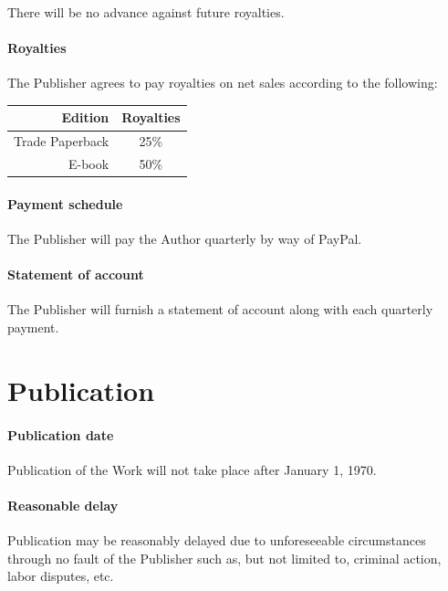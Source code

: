 \documentclass[12pt,letterpaper]{article}
\def\PrintRoyalties{25\%}
\def\DigitalRoyalties{50\%}
\def\PaymentMechanism{PayPal} %
\def\PublicationDate{January 1, 1970}
\begin{document}
There will be no advance against future royalties.

\paragraph{Royalties}

The Publisher agrees to pay royalties on net sales according to the following:

\begin{center}
\begin{tabular}{r c}
    \textbf{Edition} & \textbf{Royalties} \\ \hline
    Trade Paperback & \PrintRoyalties \\
    E-book & \DigitalRoyalties \\
    \hline
\end{tabular}
\end{center}

\paragraph{Payment schedule}

The Publisher will pay the Author quarterly by way of \PaymentMechanism.

\paragraph{Statement of account}

The Publisher will furnish a statement of account along with each quarterly payment.

\section{Publication}

\paragraph{Publication date}

Publication of the Work will not take place after \PublicationDate.

\paragraph{Reasonable delay}

Publication may be reasonably delayed due to unforeseeable circumstances through no fault of the Publisher such as, but not limited to, criminal action, labor disputes, etc.
\end{document}
